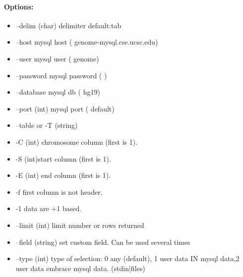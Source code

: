 \documentclass[12pt]{article}
\begin{document}
\paragraph{Options:}
\begin{itemize}
\item--delim (char) delimiter default:tab
\item--host mysql host ( genome-mysql.cse.ucsc.edu)
\item--user mysql user ( genome)
\item--password mysql password ( )
\item--database mysql db ( hg19)
\item--port (int) mysql port ( default)
\item--table or -T (string)
\item-C (int) chromosome column (first is 1).
\item-S (int)start column (first is 1).
\item-E (int) end column (first is 1).
\item-f first column is not header.
\item-1 data are +1 based.
\item--limit (int) limit number or rows returned
\item--field (string) set custom field. Can be used several times
\item--type (int) type of selection: 0 any (default), 1 user data IN mysql data,2 user data embrace mysql data. (stdin|files)
\end{itemize}
\end{document}
